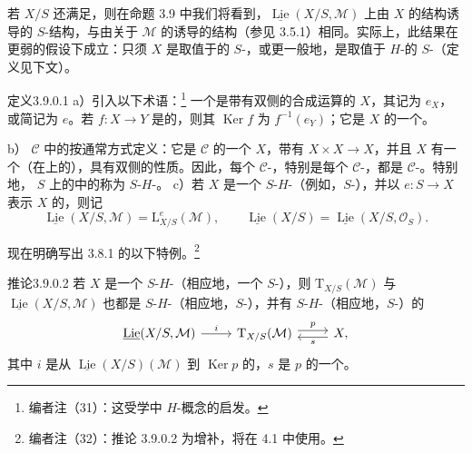 若 $X/S$ 还满足，则在命题 3.9 中我们将看到，$\underline{\operatorname{Lie}}(X/S,\mathcal M)$ 上由 $X$ 的结构诱导的 $S$-结构，与由关于 $\mathcal M$ 的诱导的结构（参见 3.5.1）相同。实际上，此结果在更弱的假设下成立：只须 $X$ 是取值于的 $S$-，或更一般地，是取值于 $H$-的 $S$-（定义见下文）。
\begin{SGAresult}{定义}{3.9.0.1}
a）引入以下术语：\footnote{编者注（31）：这受学中 $H$-概念的启发。} 一个是带有双侧的合成运算的 $X$，其记为 $e_X$，或简记为 $e$。若 $f:X\to Y$ 是的，则其 $\operatorname{Ker}f$ 为 $f^{-1}(e_Y)$；它是 $X$ 的一个。

b） $\mathscr C$ 中的按通常方式定义：它是 $\mathscr C$ 的一个 $X$，带有 $X\times X\to X$，并且 $X$ 有一个（在上的），具有双侧的性质。因此，每个 $\mathscr C$-，特别是每个 $\mathscr C$-，都是 $\mathscr C$-。特别地， $S$ 上的中的称为 $S$-$H$-。
c）若 $X$ 是一个 $S$-$H$-（例如，$S$-），并以 $e:S\to X$ 表示 $X$ 的，则记
\[
\underline{\operatorname{Lie}}(X/S,\mathcal M)=\mathrm L^e_{X/S}(\mathcal M),
\qquad
\underline{\operatorname{Lie}}(X/S)=\underline{\operatorname{Lie}}(X/S,\mathcal O_S).
\]
\end{SGAresult}
现在明确写出 3.8.1 的以下特例。\footnote{编者注（32）：推论 3.9.0.2 为增补，将在 4.1 中使用。}
\begin{SGAresult}{推论}{3.9.0.2}
若 $X$ 是一个 $S$-$H$-（相应地，一个 $S$-），则 $\mathrm T_{X/S}(\mathcal M)$ 与 $\underline{\operatorname{Lie}}(X/S,\mathcal M)$ 也都是 $S$-$H$-（相应地，$S$-），并有 $S$-$H$-（相应地，$S$-）的
\[
\begin{tikzcd}
\underline{\operatorname{Lie}}(X/S,\mathcal M)\arrow[r,"i"]&\mathrm T_{X/S}(\mathcal M)\arrow[r,shift left=.6ex,"p"]&X\arrow[l,shift left=.6ex,"s"] ,
\end{tikzcd}
\]
其中 $i$ 是从 $\underline{\operatorname{Lie}}(X/S)(\mathcal M)$ 到 $\operatorname{Ker}p$ 的，$s$ 是 $p$ 的一个。
\end{SGAresult}
